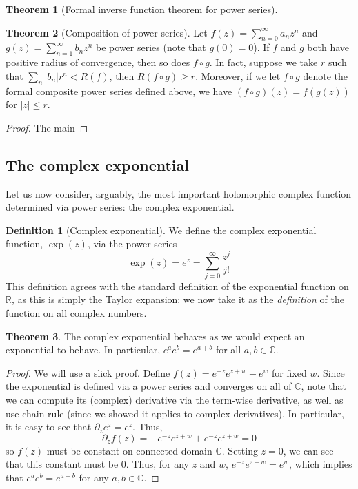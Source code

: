\documentclass[aps,pra,showpacs,notitlepage,onecolumn,superscriptaddress,nofootinbib]{revtex4-1}
\theoremstyle{definition}
\newtheorem{definition}{Definition}[section]
\newtheorem{theorem}{Theorem}[section]
\begin{document}
\begin{theorem}[Formal inverse function theorem for power series]
\end{theorem}

\begin{theorem}[Composition of power series]
  Let $f(z) = \sum_{n = 0}^{\infty} a_n z^{n}$ and $g(z) = \sum_{n = 1}^{\infty} b_n z^n$ be power series (note that $g(0) = 0$). If $f$ and $g$ both have positive radius
  of convergence, then so does $f \circ g$. In fact, suppose we take $r$ such that $\sum_{n} |b_n| r^n < R(f)$, then $R(f \circ g) \geq r$. Moreover, if we let $f \circ g$
  denote the formal composite power series defined above, we have $(f \circ g)(z) = f(g(z))$ for $|z| \leq r$.
\end{theorem}
\begin{proof}
The main 
  \end{proof}

\subsection{The complex exponential}

\noindent Let us now consider, arguably, the most important holomorphic complex function determined via power series: the complex exponential.

\begin{definition}[Complex exponential]
  We define the complex exponential function, $\exp(z)$, via the power series
  \begin{equation}
    \exp(z) = e^z = \displaystyle\sum_{j = 0}^{\infty} \frac{z^j}{j!}
  \end{equation}
  This definition agrees with the standard definition of the exponential function on $\mathbb{R}$, as this is simply the Taylor expansion: we now take it as the \emph{definition}
  of the function on all complex numbers.
\end{definition}

\begin{theorem}
  \label{thm:circ}
  The complex exponential behaves as we would expect an exponential to behave. In particular, $e^{a} e^{b} = e^{a + b}$ for all $a, b \in \mathbb{C}$.
\end{theorem}
\begin{proof}
  We will use a slick proof. Define $f(z) = e^{-z} e^{z + w} - e^{w}$ for fixed $w$. Since the exponential is defined via a power series and converges on all of $\mathbb{C}$, note that we
  can compute its (complex) derivative via the term-wise derivative, as well as use chain rule (since we showed it applies to complex derivatives). In particular, it is easy to see that $\partial_z e^{z} = e^{z}$. Thus,
  \begin{equation}
    \partial_z f(z) = -e^{-z} e^{z + w} + e^{-z} e^{z + w} = 0
  \end{equation}
  so $f(z)$ must be constant on connected domain $\mathbb{C}$. Setting $z = 0$, we can see that this constant must be $0$. Thus, for any $z$ and $w$, $e^{-z} e^{z + w} = e^{w}$, which implies that $e^{a} e^{b} = e^{a + b}$
  for any $a, b \in \mathbb{C}$.
  \end{proof}
\end{document}
